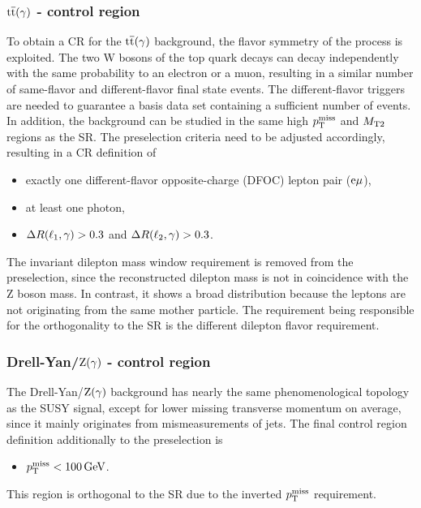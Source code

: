 \subsubsection*{${\mathrm{t}\overline{\mathrm{t}}}(\gamma)$ - control region}
To obtain a CR for the ${\mathrm{t}\overline{\mathrm{t}}}(\gamma)$ background, the flavor symmetry of the process is exploited. The two W bosons of the top quark decays can decay independently with the same probability to an electron or a muon, resulting in a similar number of same-flavor and different-flavor final state events. The different-flavor triggers are needed to guarantee a basis data set containing a sufficient number of events. In addition, the background can be studied in the same high $p_{\mathrm{T}}^\text{miss}$ and $M_{\mathrm{T2}}$ regions as the SR. The preselection criteria need to be adjusted accordingly, resulting in a CR definition of
\begin{itemize}
 \item exactly one different-flavor opposite-charge (DFOC) lepton pair ($\mathrm{e}{\mu}$),
 \item at least one photon,
 \item $\Delta R(\ell_1,\gamma)>0.3$ and $\Delta R(\ell_2,\gamma)>0.3$.
\end{itemize}
The invariant dilepton mass window requirement is removed from the preselection, since the reconstructed dilepton mass is not in coincidence with the Z boson mass. In contrast, it shows a broad distribution because the leptons are not originating from the same mother particle. The requirement being responsible for the orthogonality to the SR is the different dilepton flavor requirement.
\subsubsection*{Drell-Yan/$\mathrm{Z}(\gamma)$ - control region}
The Drell-Yan/$\mathrm{Z}(\gamma)$ background has nearly the same phenomenological topology as the SUSY signal, except for lower missing transverse momentum on average, since it mainly originates from mismeasurements of jets. The final control region definition additionally to the preselection is
\begin{itemize}
 \item $p_{\mathrm{T}}^\text{miss}<100\,\text{Ge\hspace{-.08em}V}$.
\end{itemize}
This region is orthogonal to the SR due to the inverted $p_{\mathrm{T}}^\text{miss}$ requirement.
